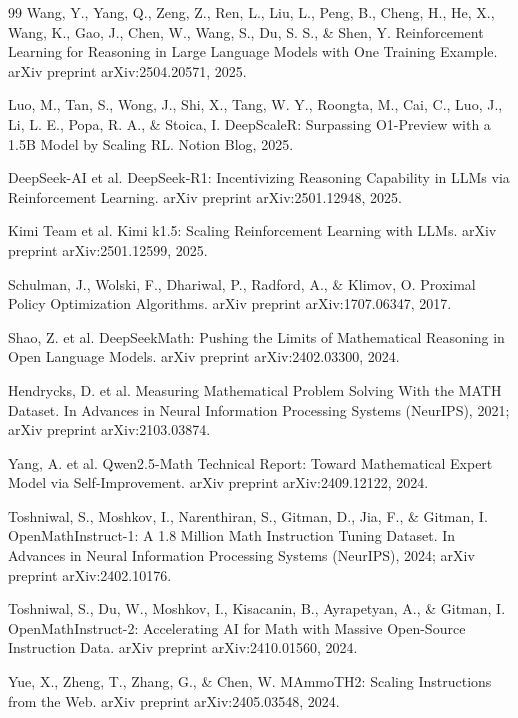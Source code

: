 \documentclass[12pt,a4paper]{ctexart}
\begin{document}
\begin{thebibliography}{99}
Wang, Y., Yang, Q., Zeng, Z., Ren, L., Liu, L., Peng, B., Cheng, H., He, X., Wang, K., Gao, J., Chen, W., Wang, S., Du, S. S., \& Shen, Y. Reinforcement Learning for Reasoning in Large Language Models with One Training Example. arXiv preprint arXiv:2504.20571, 2025.

Luo, M., Tan, S., Wong, J., Shi, X., Tang, W. Y., Roongta, M., Cai, C., Luo, J., Li, L. E., Popa, R. A., \& Stoica, I. DeepScaleR: Surpassing O1-Preview with a 1.5B Model by Scaling RL. Notion Blog, 2025.

DeepSeek-AI et al. DeepSeek-R1: Incentivizing Reasoning Capability in LLMs via Reinforcement Learning. arXiv preprint arXiv:2501.12948, 2025.

Kimi Team et al. Kimi k1.5: Scaling Reinforcement Learning with LLMs. arXiv preprint arXiv:2501.12599, 2025.

Schulman, J., Wolski, F., Dhariwal, P., Radford, A., \& Klimov, O. Proximal Policy Optimization Algorithms. arXiv preprint arXiv:1707.06347, 2017.

Shao, Z. et al. DeepSeekMath: Pushing the Limits of Mathematical Reasoning in Open Language Models. arXiv preprint arXiv:2402.03300, 2024.

Hendrycks, D. et al. Measuring Mathematical Problem Solving With the MATH Dataset. In Advances in Neural Information Processing Systems (NeurIPS), 2021; arXiv preprint arXiv:2103.03874.

Yang, A. et al. Qwen2.5-Math Technical Report: Toward Mathematical Expert Model via Self-Improvement. arXiv preprint arXiv:2409.12122, 2024.

Toshniwal, S., Moshkov, I., Narenthiran, S., Gitman, D., Jia, F., \& Gitman, I. OpenMathInstruct-1: A 1.8 Million Math Instruction Tuning Dataset. In Advances in Neural Information Processing Systems (NeurIPS), 2024; arXiv preprint arXiv:2402.10176.

Toshniwal, S., Du, W., Moshkov, I., Kisacanin, B., Ayrapetyan, A., \& Gitman, I. OpenMathInstruct-2: Accelerating AI for Math with Massive Open-Source Instruction Data. arXiv preprint arXiv:2410.01560, 2024.

Yue, X., Zheng, T., Zhang, G., \& Chen, W. MAmmoTH2: Scaling Instructions from the Web. arXiv preprint arXiv:2405.03548, 2024.


\end{thebibliography}
\end{document}
